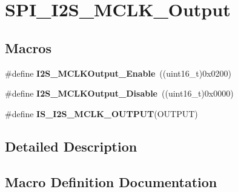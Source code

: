 \hypertarget{group___s_p_i___i2_s___m_c_l_k___output}{}\section{S\+P\+I\+\_\+\+I2\+S\+\_\+\+M\+C\+L\+K\+\_\+\+Output}
\label{group___s_p_i___i2_s___m_c_l_k___output}
\subsection*{Macros}
\begin{DoxyCompactItemize}
\item 
\hypertarget{group___s_p_i___i2_s___m_c_l_k___output_ga99713ee8c824f4d3bb25a9ce7bf5312a}{}\#define {\bfseries I2\+S\+\_\+\+M\+C\+L\+K\+Output\+\_\+\+Enable}~((uint16\+\_\+t)0x0200)\label{group___s_p_i___i2_s___m_c_l_k___output_ga99713ee8c824f4d3bb25a9ce7bf5312a}

\item 
\hypertarget{group___s_p_i___i2_s___m_c_l_k___output_gaea09824d7e6359924152277ed3661e7e}{}\#define {\bfseries I2\+S\+\_\+\+M\+C\+L\+K\+Output\+\_\+\+Disable}~((uint16\+\_\+t)0x0000)\label{group___s_p_i___i2_s___m_c_l_k___output_gaea09824d7e6359924152277ed3661e7e}

\item 
\#define {\bfseries I\+S\+\_\+\+I2\+S\+\_\+\+M\+C\+L\+K\+\_\+\+O\+U\+T\+P\+U\+T}(O\+U\+T\+P\+U\+T)
\end{DoxyCompactItemize}


\subsection{Detailed Description}


\subsection{Macro Definition Documentation}
\hypertarget{group___s_p_i___i2_s___m_c_l_k___output_ga829ae526d1d11f14592e881f800fbb8a}{}
